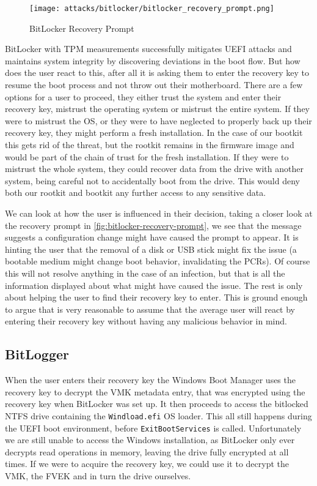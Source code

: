 \begin{figure}[htb]
    \centering
    \texttt{[image: attacks/bitlocker/bitlocker\_recovery\_prompt.png]}
    \caption{BitLocker Recovery Prompt}
    \label{fig:bitlocker-recovery-prompt}
\end{figure}

BitLocker with \ac{TPM} measurements successfully mitigates \ac{UEFI} attacks and maintains system integrity by discovering deviations in the boot flow.
But how does the user react to this, after all it is asking them to enter the recovery key to resume the boot process and not throw out their motherboard.
There are a few options for a user to proceed, they either trust the system and enter their recovery key, mistrust the operating system or mistrust the entire system.
If they were to mistrust the \ac{OS}, or they were to have neglected to properly back up their recovery key, they might perform a fresh installation.
In the case of our bootkit this gets rid of the threat, but the rootkit remains in the firmware image and would be part of the chain of trust for the fresh installation.
If they were to mistrust the whole system, they could recover data from the drive with another system, being careful not to accidentally boot from the drive.
This would deny both our rootkit and bootkit any further access to any sensitive data.

We can look at how the user is influenced in their decision, taking a closer look at the recovery prompt in \autoref{fig:bitlocker-recovery-prompt}, we see that the message suggests a configuration change might have caused the prompt to appear. It is hinting the user that the removal of a disk or \ac{USB} stick might fix the issue (a bootable medium might change boot behavior, invalidating the \acp{PCR}). Of course this will not resolve anything in the case of an infection, but that is all the information displayed about what might have caused the issue. The rest is only about helping the user to find their recovery key to enter.
This is ground enough to argue that is very reasonable to assume that the average user will react by entering their recovery key without having any malicious behavior in mind.


\subsection{BitLogger}

When the user enters their recovery key the Windows Boot Manager uses the recovery key to decrypt the \ac{VMK} metadata entry, that was encrypted using the recovery key when BitLocker was set up.
It then proceeds to access the bitlocked \ac{NTFS} drive containing the \lstinline{Windload.efi} \ac{OS} loader.
This all still happens during the \ac{UEFI} boot environment, before \lstinline{ExitBootServices} is called.
Unfortunately we are still unable to access the Windows installation, as BitLocker only ever decrypts read operations in memory, leaving the drive fully encrypted at all times.
If we were to acquire the recovery key, we could use it to decrypt the \ac{VMK}, the \ac{FVEK} and in turn the drive ourselves.

